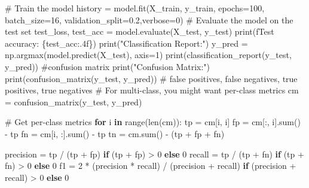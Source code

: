 \documentclass[
  letterpaper,
  DIV=11,
  numbers=noendperiod]{scrreprt}
\newenvironment{Shaded}{\begin{snugshade}}{\end{snugshade}}
\newcommand{\BuiltInTok}[1]{\textcolor[rgb]{0.00,0.23,0.31}{#1}}
\newcommand{\CommentTok}[1]{\textcolor[rgb]{0.37,0.37,0.37}{#1}}
\newcommand{\ControlFlowTok}[1]{\textcolor[rgb]{0.00,0.23,0.31}{\textbf{#1}}}
\newcommand{\DecValTok}[1]{\textcolor[rgb]{0.68,0.00,0.00}{#1}}
\newcommand{\FloatTok}[1]{\textcolor[rgb]{0.68,0.00,0.00}{#1}}
\newcommand{\KeywordTok}[1]{\textcolor[rgb]{0.00,0.23,0.31}{\textbf{#1}}}
\newcommand{\NormalTok}[1]{\textcolor[rgb]{0.00,0.23,0.31}{#1}}
\newcommand{\OperatorTok}[1]{\textcolor[rgb]{0.37,0.37,0.37}{#1}}
\newcommand{\SpecialCharTok}[1]{\textcolor[rgb]{0.37,0.37,0.37}{#1}}
\newcommand{\SpecialStringTok}[1]{\textcolor[rgb]{0.13,0.47,0.30}{#1}}
\newcommand{\StringTok}[1]{\textcolor[rgb]{0.13,0.47,0.30}{#1}}
\begin{document}
\begin{Shaded}
\begin{Highlighting}[]
\CommentTok{\# Train the model}
\NormalTok{history }\OperatorTok{=}\NormalTok{ model.fit(X\_train, y\_train, epochs}\OperatorTok{=}\DecValTok{100}\NormalTok{, batch\_size}\OperatorTok{=}\DecValTok{16}\NormalTok{, validation\_split}\OperatorTok{=}\FloatTok{0.2}\NormalTok{,verbose}\OperatorTok{=}\DecValTok{0}\NormalTok{)}
\CommentTok{\# Evaluate the model on the test set   }
\NormalTok{test\_loss, test\_acc }\OperatorTok{=}\NormalTok{ model.evaluate(X\_test, y\_test)}
\BuiltInTok{print}\NormalTok{(}\SpecialStringTok{f\textquotesingle{}Test accuracy: }\SpecialCharTok{\{}\NormalTok{test\_acc}\SpecialCharTok{:.4f\}}\SpecialStringTok{\textquotesingle{}}\NormalTok{)}
\BuiltInTok{print}\NormalTok{(}\StringTok{"Classification Report:"}\NormalTok{)}
\NormalTok{y\_pred }\OperatorTok{=}\NormalTok{ np.argmax(model.predict(X\_test), axis}\OperatorTok{=}\DecValTok{1}\NormalTok{)  }
\BuiltInTok{print}\NormalTok{(classification\_report(y\_test, y\_pred))}
\CommentTok{\#confusion matrix}
\BuiltInTok{print}\NormalTok{(}\StringTok{"Confusion Matrix:"}\NormalTok{)}
\BuiltInTok{print}\NormalTok{(confusion\_matrix(y\_test, y\_pred))}
\CommentTok{\# false positives, false negatives, true positives, true negatives}
\CommentTok{\# For multi{-}class, you might want per{-}class metrics}
\NormalTok{cm }\OperatorTok{=}\NormalTok{ confusion\_matrix(y\_test, y\_pred)}

\CommentTok{\# Get per{-}class metrics}
\ControlFlowTok{for}\NormalTok{ i }\KeywordTok{in} \BuiltInTok{range}\NormalTok{(}\BuiltInTok{len}\NormalTok{(cm)):}
\NormalTok{    tp }\OperatorTok{=}\NormalTok{ cm[i, i]}
\NormalTok{    fp }\OperatorTok{=}\NormalTok{ cm[:, i].}\BuiltInTok{sum}\NormalTok{() }\OperatorTok{{-}}\NormalTok{ tp}
\NormalTok{    fn }\OperatorTok{=}\NormalTok{ cm[i, :].}\BuiltInTok{sum}\NormalTok{() }\OperatorTok{{-}}\NormalTok{ tp}
\NormalTok{    tn }\OperatorTok{=}\NormalTok{ cm.}\BuiltInTok{sum}\NormalTok{() }\OperatorTok{{-}}\NormalTok{ (tp }\OperatorTok{+}\NormalTok{ fp }\OperatorTok{+}\NormalTok{ fn)}
    
\NormalTok{    precision }\OperatorTok{=}\NormalTok{ tp }\OperatorTok{/}\NormalTok{ (tp }\OperatorTok{+}\NormalTok{ fp) }\ControlFlowTok{if}\NormalTok{ (tp }\OperatorTok{+}\NormalTok{ fp) }\OperatorTok{\textgreater{}} \DecValTok{0} \ControlFlowTok{else} \DecValTok{0}
\NormalTok{    recall }\OperatorTok{=}\NormalTok{ tp }\OperatorTok{/}\NormalTok{ (tp }\OperatorTok{+}\NormalTok{ fn) }\ControlFlowTok{if}\NormalTok{ (tp }\OperatorTok{+}\NormalTok{ fn) }\OperatorTok{\textgreater{}} \DecValTok{0} \ControlFlowTok{else} \DecValTok{0}
\NormalTok{    f1 }\OperatorTok{=} \DecValTok{2} \OperatorTok{*}\NormalTok{ (precision }\OperatorTok{*}\NormalTok{ recall) }\OperatorTok{/}\NormalTok{ (precision }\OperatorTok{+}\NormalTok{ recall) }\ControlFlowTok{if}\NormalTok{ (precision }\OperatorTok{+}\NormalTok{ recall) }\OperatorTok{\textgreater{}} \DecValTok{0} \ControlFlowTok{else} \DecValTok{0}
    

\end{Highlighting}
\end{Shaded}
\end{document}
